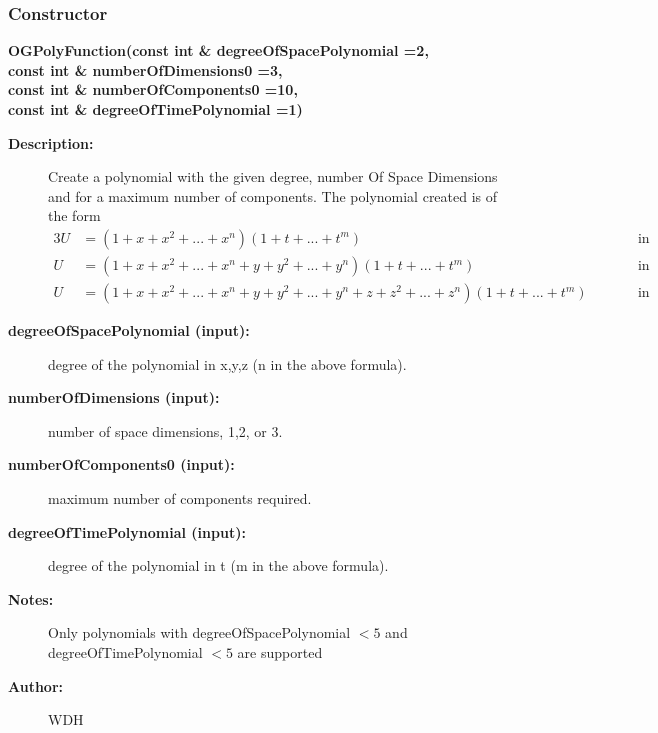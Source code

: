 \subsubsection{Constructor}
 
\newlength{\OGPolyFunctionIncludeArgIndent}
\begin{flushleft} \textbf{%
\settowidth{\OGPolyFunctionIncludeArgIndent}{OGPolyFunction(}%
OGPolyFunction(const int \& degreeOfSpacePolynomial  =2, \\ 
\hspace{\OGPolyFunctionIncludeArgIndent}const int \& numberOfDimensions0      =3,\\ 
\hspace{\OGPolyFunctionIncludeArgIndent}const int \& numberOfComponents0      =10,\\ 
\hspace{\OGPolyFunctionIncludeArgIndent}const int \& degreeOfTimePolynomial   =1)
}\end{flushleft}
\begin{description}
\item[{\bf Description:}]  
 Create a polynomial with the given degree, number Of Space Dimensions and for
 a maximum number of components. The polynomial created is of the form 
  \begin{alignat*}{3}
     U &= (1 + x + x^2 + ... + x^{n}) (1+t+...+t^{m})  &\qquad& \mbox{in 1D} \\
     U &= (1 + x + x^2 + ... + x^{n} + y + y^2 + ... + y^{n} )(1+t+...+t^{m})  &\qquad& \mbox{in 2D} \\
     U &= (1 + x + x^2 + ... + x^{n} + y + y^2 + ... + y^{n} +z + z^2 + ... +z^n)(1+t+...+t^{m})  &\qquad& \mbox{in 3D}
  \end{alignat*}

\item[{\bf degreeOfSpacePolynomial (input):}]  degree of the polynomial in x,y,z (n in the above formula).
\item[{\bf numberOfDimensions (input):}]  number of space dimensions, 1,2, or 3.
\item[{\bf numberOfComponents0 (input):}]  maximum number of components required.
\item[{\bf degreeOfTimePolynomial (input):}]  degree of the polynomial in t (m in the above formula).
 
\item[{\bf Notes:}] 
  Only polynomials with degreeOfSpacePolynomial $<5$ and degreeOfTimePolynomial $<5$ are supported
\item[{\bf Author:}]  WDH
\end{description}
